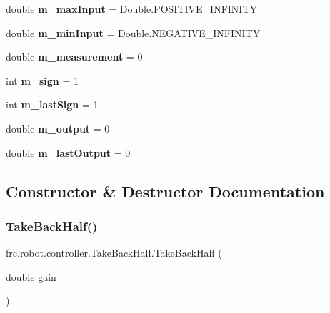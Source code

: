\begin{DoxyCompactItemize}
double {\bfseries m\+\_\+max\+Input} = Double.\+P\+O\+S\+I\+T\+I\+V\+E\+\_\+\+I\+N\+F\+I\+N\+I\+TY
\item 
\mbox{\label{classfrc_1_1robot_1_1controller_1_1_take_back_half_aafa545ed3a44cd3a742ab005b4c9b39d}} 
double {\bfseries m\+\_\+min\+Input} = Double.\+N\+E\+G\+A\+T\+I\+V\+E\+\_\+\+I\+N\+F\+I\+N\+I\+TY
\item 
\mbox{\label{classfrc_1_1robot_1_1controller_1_1_take_back_half_a6f3873996fb8995d625927eac74a10d8}} 
double {\bfseries m\+\_\+measurement} = 0
\item 
\mbox{\label{classfrc_1_1robot_1_1controller_1_1_take_back_half_aba6aaf22ff176d145f9a4a4dd6f62931}} 
int {\bfseries m\+\_\+sign} = 1
\item 
\mbox{\label{classfrc_1_1robot_1_1controller_1_1_take_back_half_aeff52a9c0de3cebb8eaceab66182b7a4}} 
int {\bfseries m\+\_\+last\+Sign} = 1
\item 
\mbox{\label{classfrc_1_1robot_1_1controller_1_1_take_back_half_a4644b1788a1ab164072098c8da7cef54}} 
double {\bfseries m\+\_\+output} = 0
\item 
\mbox{\label{classfrc_1_1robot_1_1controller_1_1_take_back_half_a2ec84c4167a5b759c3cc539e9d0e94d5}} 
double {\bfseries m\+\_\+last\+Output} = 0
\end{DoxyCompactItemize}


\subsection{Constructor \& Destructor Documentation}
\mbox{\label{classfrc_1_1robot_1_1controller_1_1_take_back_half_aabeaf60031d2fe81d96d0ad0e8b9ea6d}} 
\subsubsection{\texorpdfstring{TakeBackHalf()}{TakeBackHalf()}}
{\footnotesize\ttfamily frc.\+robot.\+controller.\+Take\+Back\+Half.\+Take\+Back\+Half (\begin{DoxyParamCaption}\item[{double}]{gain }\end{DoxyParamCaption})\hspace{0.3cm}{\ttfamily [inline]}}

